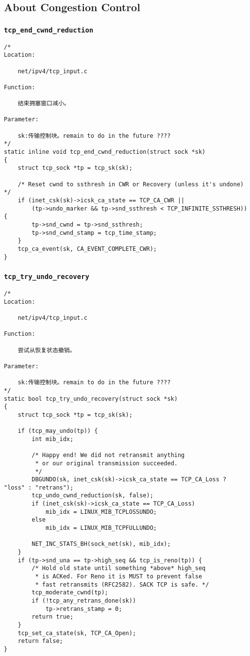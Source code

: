     \subsection{About Congestion Control}
        \subsubsection{\texttt{tcp_end_cwnd_reduction}}
\begin{verbatim}
/* 
Location:

    net/ipv4/tcp_input.c

Function:

    结束拥塞窗口减小。

Parameter:

    sk:传输控制块。remain to do in the future ????
*/
static inline void tcp_end_cwnd_reduction(struct sock *sk)
{
    struct tcp_sock *tp = tcp_sk(sk);

    /* Reset cwnd to ssthresh in CWR or Recovery (unless it's undone) */
    if (inet_csk(sk)->icsk_ca_state == TCP_CA_CWR ||
        (tp->undo_marker && tp->snd_ssthresh < TCP_INFINITE_SSTHRESH)) {
        tp->snd_cwnd = tp->snd_ssthresh;
        tp->snd_cwnd_stamp = tcp_time_stamp;
    }
    tcp_ca_event(sk, CA_EVENT_COMPLETE_CWR);
}
\end{verbatim}
        \subsubsection{\texttt{tcp_try_undo_recovery}}
\begin{verbatim}
/* 
Location:

    net/ipv4/tcp_input.c

Function:

    尝试从恢复状态撤销。

Parameter:

    sk:传输控制块。remain to do in the future ????
*/
static bool tcp_try_undo_recovery(struct sock *sk)
{
    struct tcp_sock *tp = tcp_sk(sk);

    if (tcp_may_undo(tp)) {
        int mib_idx;

        /* Happy end! We did not retransmit anything
         * or our original transmission succeeded.
         */
        DBGUNDO(sk, inet_csk(sk)->icsk_ca_state == TCP_CA_Loss ? "loss" : "retrans");
        tcp_undo_cwnd_reduction(sk, false);
        if (inet_csk(sk)->icsk_ca_state == TCP_CA_Loss)
            mib_idx = LINUX_MIB_TCPLOSSUNDO;
        else
            mib_idx = LINUX_MIB_TCPFULLUNDO;

        NET_INC_STATS_BH(sock_net(sk), mib_idx);
    }
    if (tp->snd_una == tp->high_seq && tcp_is_reno(tp)) {
        /* Hold old state until something *above* high_seq
         * is ACKed. For Reno it is MUST to prevent false
         * fast retransmits (RFC2582). SACK TCP is safe. */
        tcp_moderate_cwnd(tp);
        if (!tcp_any_retrans_done(sk))
            tp->retrans_stamp = 0;
        return true;
    }
    tcp_set_ca_state(sk, TCP_CA_Open);
    return false;
}
\end{verbatim}
